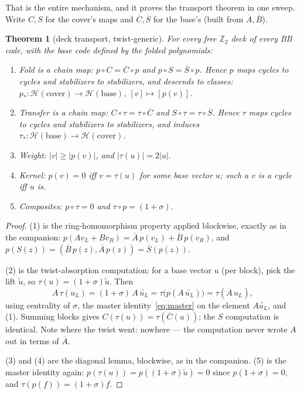 \documentclass[11pt]{article}
\theoremstyle{plain}
\newtheorem{theorem}{Theorem}[section]
\theoremstyle{definition}
\theoremstyle{remark}
\newcommand{\Z}{\mathbb{Z}}
\newcommand{\clH}{\mathcal{H}}
\newcommand{\base}{\mathrm{base}}
\newcommand{\cov}{\mathrm{cover}}
\newcommand{\wt}[1]{\lvert #1\rvert}
\newcommand{\ov}[1]{\overline{#1}}
\begin{document}
That is the entire mechanism, and it proves the transport theorem in one
sweep. Write $C, S$ for the cover's maps and $\ov C, \ov S$ for the base's
(built from $\ov A, \ov B$).

\begin{theorem}[deck transport, twist-generic]\label{thm:transport}
For every free $\Z_2$ deck of every BB code, with the base code defined by
the folded polynomials:
\begin{enumerate}[label=\emph{(\arabic*)},leftmargin=2.4em]
\item \emph{Fold is a chain map:} $p \circ C = \ov C \circ p$ and
  $p \circ S = \ov S \circ p$. Hence $p$ maps cycles to cycles and
  stabilizers to stabilizers, and descends to classes:
  $p_* : \clH(\cov) \to \clH(\base)$, $[v] \mapsto [p(v)]$.
\item \emph{Transfer is a chain map:} $C \circ \tau = \tau \circ \ov C$
  and $S \circ \tau = \tau \circ \ov S$. Hence $\tau$ maps cycles to
  cycles and stabilizers to stabilizers, and induces
  $\tau_* : \clH(\base) \to \clH(\cov)$.
\item \emph{Weight:} $\wt{v} \geq \wt{p(v)}$, and $\wt{\tau(u)} = 2\wt{u}$.
\item \emph{Kernel:} $p(v) = 0$ iff $v = \tau(u)$ for some base vector
  $u$; such a $v$ is a cycle iff $u$ is.
\item \emph{Composites:} $p \circ \tau = 0$ and $\tau \circ p =
  (1 + \sigma)$.
\end{enumerate}
\end{theorem}

\begin{proof}
(1) is the ring-homomorphism property applied blockwise, exactly as in the
companion: $p(Av_L + Bv_R) = \ov A\,p(v_L) + \ov B\,p(v_R)$, and
$p(S(z)) = (\ov B\,p(z), \ov A\,p(z)) = \ov S(p(z))$.

(2) is the twist-absorption computation: for a base vector $u$ (per
block), pick the lift $\widetilde u$, so $\tau(u) = (1+\sigma)\widetilde
u$. Then
\[
A\,\tau(u_L) = (1+\sigma)\,A\,\widetilde{u_L}
= \tau\bigl(p(A\,\widetilde{u_L})\bigr) = \tau(\ov A\, u_L),
\]
using centrality of $\sigma$, the master identity~\eqref{eq:master} on the
element $A\widetilde{u_L}$, and (1). Summing blocks gives $C(\tau(u)) =
\tau(\ov C(u))$; the $S$ computation is identical. Note where the twist
went: nowhere --- the computation never wrote $A$ out in terms of $\ov A$.

(3) and (4) are the diagonal lemma, blockwise, as in the companion. (5) is
the master identity again: $p(\tau(u)) = p((1+\sigma)\widetilde u) = 0$
since $p(1+\sigma) = 0$, and $\tau(p(f)) = (1+\sigma)f$.
\end{proof}
\end{document}
